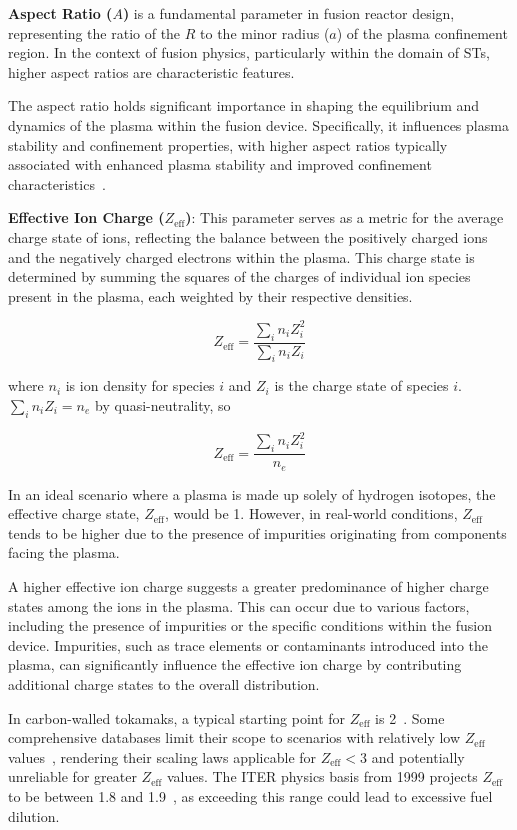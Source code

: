 \documentclass[journal]{IEEEtran}
\begin{document}
\textbf{Aspect Ratio ($A$)} is a fundamental parameter in fusion reactor design, representing the ratio of the $R$ to the minor radius ($a$) of the plasma confinement region. In the context of fusion physics, particularly within the domain of STs, higher aspect ratios are characteristic features.

The aspect ratio holds significant importance in shaping the equilibrium and dynamics of the plasma within the fusion device. Specifically, it influences plasma stability and confinement properties, with higher aspect ratios typically associated with enhanced plasma stability and improved confinement characteristics~\cite{Costley2019}.

\textbf{Effective Ion Charge ($Z_{\text{eff}}$)}: This parameter serves as a metric for the average charge state of ions, reflecting the balance between the positively charged ions and the negatively charged electrons within the plasma. This charge state is determined by summing the squares of the charges of individual ion species present in the plasma, each weighted by their respective densities.

\begin{equation}
    Z_{\text{eff}}=\frac {\sum _{i}n_{i}Z_{i}^{2}}{\sum _{i}n_{i}Z_{i}}
\end{equation}

where $n_{i}$ is ion density for species $i$ and $Z_{i}$ is the charge state of species $i$. $\sum _{i}n_{i}Z_{i}=n_{e}$ by quasi-neutrality, so

\begin{equation}
    Z_{\text{eff}}=\frac {\sum _{i}n_{i}Z_{i}^{2}}{n_{e}}
\end{equation}

In an ideal scenario where a plasma is made up solely of hydrogen isotopes, the effective charge state, $Z_{\text{eff}}$, would be 1. However, in real-world conditions, $Z_{\text{eff}}$ tends to be higher due to the presence of impurities originating from components facing the plasma.

A higher effective ion charge suggests a greater predominance of higher charge states among the ions in the plasma. This can occur due to various factors, including the presence of impurities or the specific conditions within the fusion device. Impurities, such as trace elements or contaminants introduced into the plasma, can significantly influence the effective ion charge by contributing additional charge states to the overall distribution.

In carbon-walled tokamaks, a typical starting point for $Z_{\text{eff}}$ is 2~\cite{Carlstrom1999, Eich2011}. Some comprehensive databases limit their scope to scenarios with relatively low $Z_{\text{eff}}$ values~\cite{Schissel1988}, rendering their scaling laws applicable for $Z_{\text{eff}}<3$ and potentially unreliable for greater $Z_{\text{eff}}$ values. The ITER physics basis from 1999 projects $Z_{\text{eff}}$ to be between 1.8 and 1.9~\cite{ITER19991, ITER19994}, as exceeding this range could lead to excessive fuel dilution.
\end{document}
